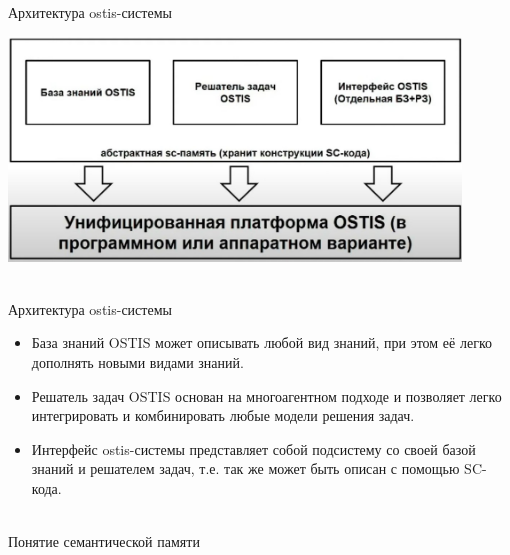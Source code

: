 \begin{frame}{\\Архитектура ostis-системы}
	\vspace{10mm}
	\begin{center} 
		\includegraphics[width=120mm]{./part1/pictures/scheme.jpeg}
	\end{center}
\end{frame}

\begin{frame}{\\Архитектура ostis-системы}
	\vspace{10mm}
	\begin{itemize}
		\item База знаний OSTIS может описывать любой вид знаний, при этом её легко дополнять новыми видами знаний.
		\item Решатель задач OSTIS основан на многоагентном подходе и позволяет легко интегрировать и комбинировать любые модели решения задач.
		\item Интерфейс  ostis-системы представляет собой подсистему со своей базой знаний и решателем задач, т.е. так же может быть описан с помощью SC-кода.
	\end{itemize}
	
\end{frame}

\begin{frame}{\\Понятие семантической памяти}
	
\end{frame}

